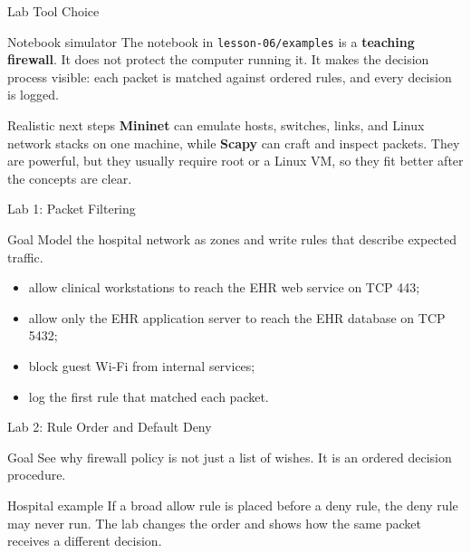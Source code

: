 \documentclass[presentation]{beamer}
\begin{document}
\begin{frame}[c]{Lab Tool Choice}
\begin{block}{Notebook simulator}
The notebook in \texttt{lesson-06/examples} is a \textbf{teaching firewall}. It does not protect the
computer running it. It makes the decision process visible: each packet is matched against ordered
rules, and every decision is logged.
\end{block}

\begin{block}{Realistic next steps}
\textbf{Mininet} can emulate hosts, switches, links, and Linux network stacks on one machine, while
\textbf{Scapy} can craft and inspect packets. They are powerful, but they usually require root or a
Linux VM, so they fit better after the concepts are clear.
\end{block}
\end{frame}

\begin{frame}[c]{Lab 1: Packet Filtering}
\begin{block}{Goal}
Model the hospital network as zones and write rules that describe expected traffic.
\end{block}

\begin{itemize}
    \item allow clinical workstations to reach the EHR web service on TCP 443;
    \item allow only the EHR application server to reach the EHR database on TCP 5432;
    \item block guest Wi-Fi from internal services;
    \item log the first rule that matched each packet.
\end{itemize}
\end{frame}

\begin{frame}[c]{Lab 2: Rule Order and Default Deny}
\begin{block}{Goal}
See why firewall policy is not just a list of wishes. It is an ordered decision procedure.
\end{block}

\begin{exampleblock}{Hospital example}
If a broad allow rule is placed before a deny rule, the deny rule may never run. The lab changes the
order and shows how the same packet receives a different decision.
\end{exampleblock}
\end{frame}
\end{document}
